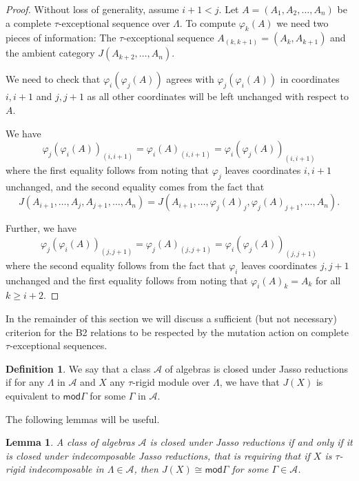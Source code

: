 \documentclass[11pt]{amsart}
\newcommand{\mods}{\mathsf{mod}}
\newtheorem{lemma}[theorem]{Lemma}
\theoremstyle{definition}
\newtheorem{definition}[theorem]{Definition}
\begin{document}
\begin{proof}
        Without loss of generality, assume $i+1 < j$. Let $A = (A_1,A_2,\dots,A_n)$ be a complete $\tau$-exceptional sequence over $\Lambda$. To compute $\varphi_k(A)$ we need two pieces of information: The $\tau$-exceptional sequence $A_{(k,k+1)} = (A_k,A_{k+1})$ and the ambient category $J(A_{k+2},\dots,A_n)$. 
        
        We need to check that $\varphi_i(\varphi_j(A))$ agrees with $\varphi_j(\varphi_i(A))$ in coordinates $i,i+1$ and $j,j+1$ as all other coordinates will be left unchanged with respect to $A$. 

        We have \[\varphi_j(\varphi_i(A))_{(i,i+1)} = \varphi_i(A)_{(i,i+1)} = \varphi_i(\varphi_j(A))_{(i,i+1)}\] where the first equality follows from noting that $\varphi_j$ leaves coordinates $i,i+1$ unchanged, and the second equality comes from the fact that \[J(A_{i+1},\dots,A_j,A_{j+1},\dots,A_n) = J(A_{i+1},\dots,\varphi_j(A)_j,\varphi_j(A)_{j+1},\dots,A_n).\] 

        Further, we have \[\varphi_j(\varphi_i(A))_{(j,j+1)} = \varphi_j(A)_{(j,j+1)} = \varphi_i(\varphi_j(A))_{(j,j+1)}\] where the second equality follows from the fact that $\varphi_i$ leaves coordinates $j,j+1$ unchanged and the first equality follows from noting that $\varphi_i(A)_{k} = A_{k}$ for all $k \geq i+2$.  
\end{proof}

In the remainder of this section we will discuss a sufficient (but not necessary) criterion for the B2 relations to be respected by the mutation action on complete $\tau$-exceptional sequences.

\begin{definition}
    We say that a class $\mathcal{A}$ of algebras is closed under Jasso reductions if for any $\Lambda$  in $\mathcal{A}$ and $X$ any $\tau$-rigid module over $\Lambda$, we have that $J(X)$ is equivalent to $\mods \Gamma$ for some $\Gamma$ in $\mathcal{A}$. 
\end{definition}

The following lemmas will be useful.


\begin{lemma}\label{lem:closed_under_jasso_when_closed_under_indec_jasso}
    A class of algebras $\mathcal{A}$ is closed under Jasso reductions if and only if it is closed under \textit{indecomposable} Jasso reductions, that is requiring that if $X$ is $\tau$-rigid indecomposable in $\Lambda \in \mathcal{A}$, then $J(X) \cong \mods \Gamma$ for some $\Gamma \in \mathcal{A}$.
\end{lemma}
\end{document}
